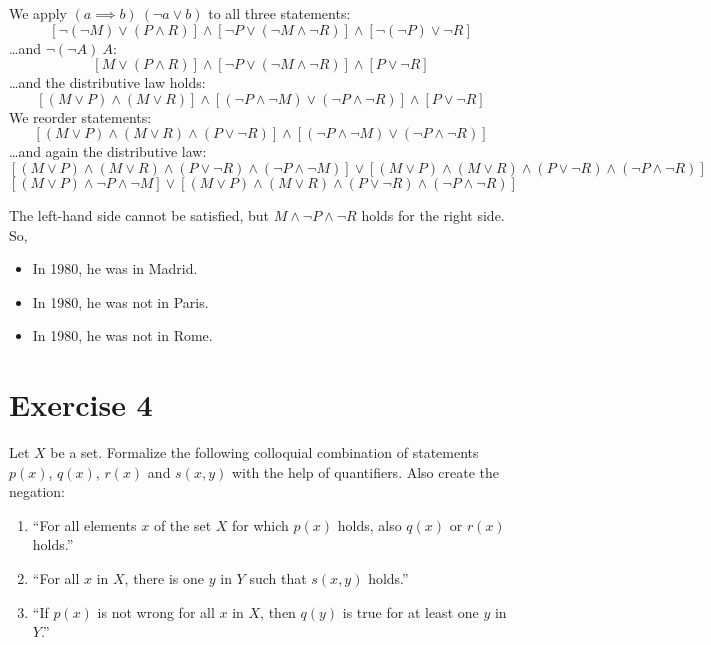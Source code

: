 \documentclass[a4paper]{article}
\theoremstyle{definition}
\begin{document}
We apply $(a \implies b) \ (\neg a \lor b)$ to all three statements:
\[
    \left[\neg(\neg M) \lor (P \land R)\right] \land
    \left[\neg P \lor (\neg M \land \neg R)\right] \land
    \left[\neg(\neg P) \lor \neg R\right]
\]
\dots and $\neg(\neg A) \ A$:
\[
    \left[M \lor (P \land R)\right] \land
    \left[\neg P \lor (\neg M \land \neg R)\right] \land
    \left[P \lor \neg R\right]
\]
\dots and the distributive law holds:
\[
    \left[(M \lor P) \land (M \lor R)\right] \land
    \left[(\neg P \land \neg M) \lor (\neg P \land \neg R)\right] \land
    \left[P \lor \neg R\right]
\]
We reorder statements:
\[
    \left[(M \lor P) \land (M \lor R) \land (P \lor \neg R)\right] \land
    \left[(\neg P \land \neg M) \lor (\neg P \land \neg R)\right]
\]
\dots and again the distributive law:
\[
    \left[(M \lor P) \land (M \lor R) \land (P \lor \neg R) \land (\neg P \land \neg M)\right] \lor
    \left[(M \lor P) \land (M \lor R) \land (P \lor \neg R) \land (\neg P \land \neg R)\right]
\]
\[
    \left[(M \lor P) \land \neg P \land \neg M\right] \lor
    \left[(M \lor P) \land (M \lor R) \land (P \lor \neg R) \land (\neg P \land \neg R)\right]
\]

The left-hand side cannot be satisfied, but $M \land \neg P \land \neg R$ holds for the right side.
So,
\begin{itemize}
  \item In 1980, he was in Madrid.
  \item In 1980, he was not in Paris.
  \item In 1980, he was not in Rome.
\end{itemize}

\section{Exercise 4}
\begin{ex}
  Let $X$ be a set. Formalize the following colloquial combination of statements
  $p(x)$, $q(x)$, $r(x)$ and $s(x, y)$ with the help of quantifiers. Also create
  the negation:
  \begin{enumerate}
    \item \enquote{For all elements $x$ of the set $X$ for which $p(x)$ holds, also $q(x)$ or $r(x)$ holds.}
    \item \enquote{For all $x$ in $X$, there is one $y$ in $Y$ such that $s(x,y)$ holds.}
    \item \enquote{If $p(x)$ is not wrong for all $x$ in $X$, then $q(y)$ is true for at least one $y$ in $Y$.}
  \end{enumerate}
\end{ex}
\end{document}
